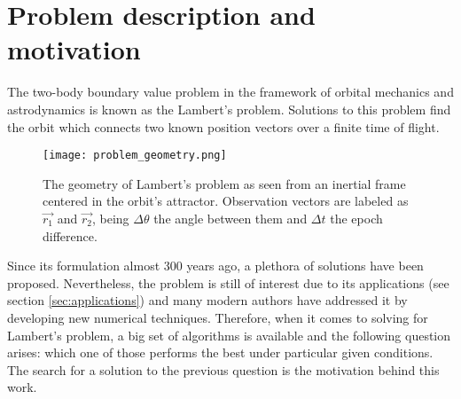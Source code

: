 \section{Problem description and motivation}

The two-body boundary value problem in the framework of orbital mechanics and
astrodynamics is known as the Lambert's problem. Solutions to this problem find
the orbit which connects two known position vectors over a finite time of
flight.

\begin{figure}[H]
  \centering
  \texttt{[image: problem\_geometry.png]}
  \caption{
    The geometry of Lambert's problem as seen from an inertial frame
    centered in the orbit's attractor. Observation vectors are labeled as
    $\vec{r_{1}}$ and $\vec{r_{2}}$, being $\Delta \theta$ the angle between
    them and $\Delta t$ the epoch difference.
  }
  \label{fig:problem_geometry}
\end{figure}

Since its formulation almost 300 years ago, a plethora of solutions have been
proposed. Nevertheless, the problem is still of interest due to its applications
(see section \ref{sec:applications}) and many modern authors have addressed it
by developing new numerical techniques. Therefore, when it comes to solving for
Lambert's problem, a big set of algorithms is available and the following
question arises: which one of those performs the best under particular given
conditions. The search for a solution to the previous question is the motivation
behind this work.
